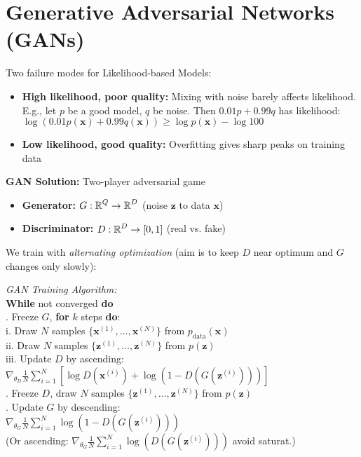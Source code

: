 \section{Generative Adversarial Networks (GANs)}

Two failure modes for Likelihood-based Models:
\begin{itemize}
    \item \textbf{High likelihood, poor quality:} Mixing with noise barely affects likelihood. E.g., let $p$ be a good model, $q$ be noise. Then $0.01p + 0.99q$ has likelihood: $\log(0.01p(\mathbf{x}) + 0.99q(\mathbf{x})) \geq \log p(\mathbf{x}) - \log 100$
    \item \textbf{Low likelihood, good quality:} Overfitting gives sharp peaks on training data
\end{itemize}

\textbf{GAN Solution:} Two-player adversarial game
\begin{itemize}
    \item \textbf{Generator:} $G: \operatorname{\mathbb{R}}^Q \to \operatorname{\mathbb{R}}^D$ (noise $\mathbf{z}$ to data $\mathbf{x}$)
    \item \textbf{Discriminator:} $D: \operatorname{\mathbb{R}}^D \to [0,1]$ (real vs. fake)
\end{itemize}


We train with \textit{alternating optimization} (aim is to keep $D$ near optimum and $G$ changes only slowly):

\begin{highlightbox*}[gray!30]
\footnotesize
\emph{GAN Training Algorithm:}\\
\textbf{While} not converged \textbf{do}\\
. Freeze $G$, \textbf{for} $k$ steps \textbf{do}:\\
\quad\quad i. Draw $N$ samples $\{\mathbf{x}^{(1)}, \ldots, \mathbf{x}^{(N)}\}$ from $p_{\text{data}}(\mathbf{x})$\\
\quad\quad ii. Draw $N$ samples $\{\mathbf{z}^{(1)}, \ldots, \mathbf{z}^{(N)}\}$ from $p(\mathbf{z})$\\
\quad\quad iii. Update $D$ by ascending: \\
\quad\quad\quad  $\nabla_{\theta_D} \frac{1}{N} \sum_{i=1}^N [\log D(\mathbf{x}^{(i)}) + \log(1 - D(G(\mathbf{z}^{(i)})))]$\\
. Freeze $D$, draw $N$ samples $\{\mathbf{z}^{(1)}, \ldots, \mathbf{z}^{(N)}\}$ from $p(\mathbf{z})$\\
. Update $G$ by descending: \\
\quad\quad $\nabla_{\theta_G} \frac{1}{N} \sum_{i=1}^N \log(1 - D(G(\mathbf{z}^{(i)})))$\\
(Or ascending: $\nabla_{\theta_G} \frac{1}{N} \sum_{i=1}^N \log(D(G(\mathbf{z}^{(i)})))$ avoid saturat.)
\end{highlightbox*}

